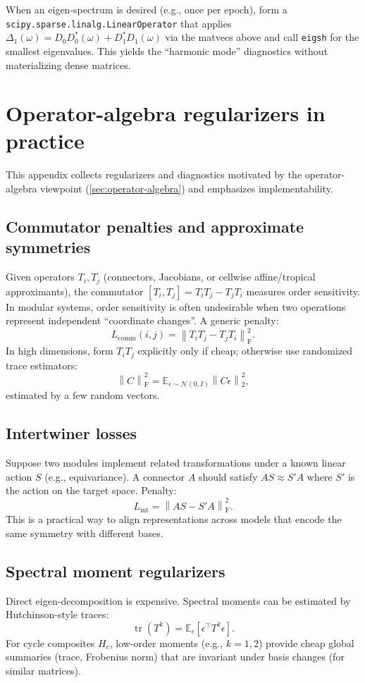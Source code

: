 \documentclass[11pt]{article}
\theoremstyle{definition}
\theoremstyle{plain}
\theoremstyle{remark}
\newcommand{\E}{\mathbb{E}}
\newcommand{\norm}[1]{\left\lVert #1 \right\rVert}
\newcommand{\Frob}[1]{\left\lVert #1 \right\rVert_{\mathrm{F}}}
\newcommand{\tr}{\operatorname{tr}}
\newcommand{\mc}[1]{\mathcal{#1}}
\begin{document}
When an eigen-spectrum is desired (e.g., once per epoch), form a \texttt{scipy.sparse.linalg.LinearOperator} that applies
$\Delta_1(\omega)=D_0D_0^\ast(\omega)+D_1^\ast D_1(\omega)$
via the matvecs above and call \texttt{eigsh} for the smallest eigenvalues.
This yields the ``harmonic mode'' diagnostics without materializing dense matrices.

\section{Operator-algebra regularizers in practice}
\label{app:opreg}

This appendix collects regularizers and diagnostics motivated by the operator-algebra viewpoint (\cref{sec:operator-algebra}) and emphasizes implementability.

\subsection{Commutator penalties and approximate symmetries}
Given operators $T_i,T_j$ (connectors, Jacobians, or cellwise affine/tropical approximants), the commutator
$[T_i,T_j]=T_iT_j-T_jT_i$ measures order sensitivity.
In modular systems, order sensitivity is often undesirable when two operations represent independent ``coordinate changes''.
A generic penalty:
\[
L_{\mathrm{comm}}(i,j) = \Frob{T_iT_j-T_jT_i}^2.
\]
In high dimensions, form $T_iT_j$ explicitly only if cheap; otherwise use randomized trace estimators:
\[
\Frob{C}^2 = \E_{\epsilon\sim\mc{N}(0,I)} \norm{C\epsilon}_2^2,
\]
estimated by a few random vectors.

\subsection{Intertwiner losses}
Suppose two modules implement related transformations under a known linear action $S$ (e.g., equivariance).
A connector $A$ should satisfy $AS\approx S'A$ where $S'$ is the action on the target space.
Penalty:
\[
L_{\mathrm{int}} = \Frob{AS - S'A}^2.
\]
This is a practical way to align representations across models that encode the same symmetry with different bases.

\subsection{Spectral moment regularizers}
Direct eigen-decomposition is expensive.
Spectral moments can be estimated by Hutchinson-style traces:
\[
\tr(T^k) = \E_\epsilon\left[\epsilon^\top T^k \epsilon\right].
\]
For cycle composites $H_c$, low-order moments (e.g., $k=1,2$) provide cheap global summaries (trace, Frobenius norm) that are invariant under basis changes (for similar matrices).
\end{document}
